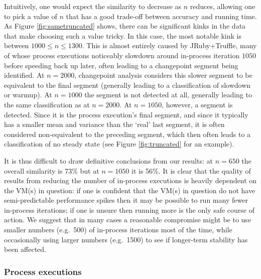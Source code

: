 \documentclass[acmsmall,screen]{acmart}
\begin{document}
Intuitively, one would expect the similarity to decrease as $n$ reduces, allowing
one to pick a value of $n$ that has a good trade-off between accuracy and running time.
As Figure \ref{fig:sametruncated} shows, there can be significant
kinks in the data that make choosing such a value tricky. In this case, the most
notable kink is between $1000 \leq n \leq 1300$. This is almost entirely caused by
JRuby+Truffle, many of whose process executions noticeably slowdown around in-process iteration $1050$ before
speeding back up later, often leading to a changepoint
segment being identified. At $n=2000$, changepoint analysis considers this slower
segment to be equivalent to the final segment (generally leading to a classification
of slowdown or warmup). At $n=1000$ the segment is not detected at all, generally
leading to the same classification as at $n=2000$. At $n=1050$, however, a
segment is detected. Since it is the process execution's final segment,
and since it typically has a smaller mean and variance than the `real' last
segment, it is often considered non-equivalent to the preceding segment,
which then often leads to a classification of no steady state
(see Figure \ref{fig:truncated} for an example).

It is thus difficult to draw definitive conclusions from our results:
at $n=650$ the overall similarity is 73\% but at $n=1050$ it is 56\%.
It is clear that the quality of results from reducing the number
of in-process executions
is heavily dependent on the VM(s) in question: if one is confident that the VM(s) in question do not have
semi-predictable performance spikes then it may be possible to run many fewer
in-process iterations; if one is unsure then running more is the only safe
course of action. We suggest that in many cases a reasonable compromise might be to
use smaller numbers (e.g.~500) of in-process iterations most
of the time, while occasionally using larger numbers (e.g.~1500) to see if
longer-term stability has been affected.


\subsubsection{Process executions}
\end{document}
